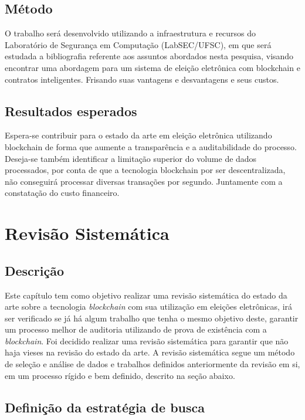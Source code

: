 \documentclass{ufsctex/ufsctex}
\begin{document}
\section{Método}

O trabalho será desenvolvido utilizando a infraestrutura e recursos do
Laboratório de Segurança em Computação (LabSEC/UFSC), em que será estudada a
bibliografia referente aos assuntos abordados nesta pesquisa, visando encontrar
uma abordagem para um sistema de eleição eletrônica com blockchain e contratos
inteligentes.  Frisando suas vantagens e desvantagens e seus custos.

\section{Resultados esperados}

Espera-se contribuir para o estado da arte em eleição eletrônica utilizando
blockchain de forma que aumente a transparência e a auditabilidade do processo.
Deseja-se também identificar a limitação superior do volume de dados
processados, por conta de que a tecnologia blockchain por ser descentralizada,
não conseguirá processar diversas transações por segundo. Juntamente com a
constatação do custo financeiro.

\chapter{Revisão Sistemática}

\section{Descrição}

Este capítulo tem como objetivo realizar uma revisão sistemática do estado da
arte sobre a tecnologia \textit{blockchain} com sua utilização em eleições
eletrônicas, irá ser verificado se já há algum trabalho que tenha o mesmo
objetivo deste, garantir um processo melhor de auditoria utilizando de prova de
existência com a \textit{blockchain}. Foi decidido realizar uma revisão
sistemática para garantir que não haja vieses na revisão do estado da arte. A
revisão sistemática segue um método de seleção e análise de dados e trabalhos
definidos anteriormente da revisão em si, em um processo rígido e bem definido,
descrito na seção abaixo.

\section{Definição da estratégia de busca}
\end{document}
